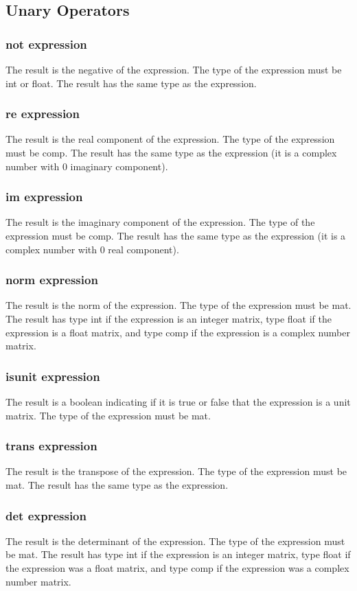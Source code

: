 \subsection{Unary Operators}
\subsubsection{not expression}
The result is the negative of the expression. The type of the expression must be int or float. The result has the same type as the expression.
\subsubsection{re expression}
The result is the real component of the expression. The type of the expression must be comp. The result has the same type as the expression (it is a complex number with  0 imaginary component).
\subsubsection{im expression}
The result is the imaginary component of the expression. The type of the expression must be comp. The result has the same type as the expression (it is a complex number with  0 real component).
\subsubsection{norm expression}
The result is the norm of the expression. The type of the expression must be mat. The result has type int if the expression is an integer matrix, type float if the expression is a float matrix, and type comp if the expression is a complex number matrix.
\subsubsection{isunit expression}
The result is a boolean indicating if it is true or false that the expression is a unit matrix. The type of the expression must be mat.
\subsubsection{trans expression}
The result is the transpose of the expression. The type of the expression must be mat. The result has the same type as the expression.
\subsubsection{det expression}
The result is the determinant of the expression. The type of the expression must be mat. The result has type int if the expression is an integer matrix,  type float if the expression was a float matrix, and type comp if the expression was a complex number matrix.

